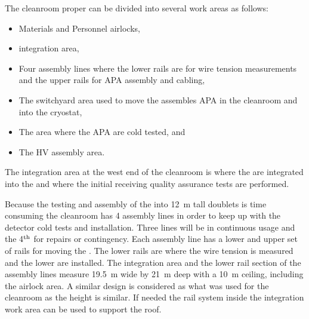 The cleanroom proper can be divided into several work areas as follows:
\begin{itemize}
\setlength\itemsep{1mm}
\setlength{\parsep}{1mm}
\setlength{\itemsep}{-5mm}
    \item Materials and Personnel airlocks,
    \item {} integration area,
    \item Four  assembly lines where the lower rails are for wire tension measurements and the upper rails for APA  assembly and cabling,
    \item The switchyard area used to move the assembles APA in the cleanroom and into the cryostat,
    \item The \coldbox area where the APA are cold tested, and
    \item The HV assembly area.
\end{itemize}

The  integration area at the west end of the cleanroom is where the  are integrated into the  and where the initial receiving quality assurance tests are performed. 

Because the testing and assembly of the  into \SI{12}{m} tall doublets is time consuming the cleanroom has 4 assembly lines in order to keep up with the detector cold tests and installation. 
Three lines will be in continuous usage and the 4$^{\rm th}$ for repairs or contingency. 
Each assembly line has a lower and upper set of rails for moving the .
The lower rails are where the wire tension is measured and the lower   are installed. The  integration area and the lower rail section of the assembly lines measure \SI{19.5}{m} wide by \SI{21}{m} deep with a \SI{10}{m} ceiling, including the airlock area. 
A similar design is considered as what was used for the  cleanroom as the height is similar. 
If needed the rail system inside the integration work area can be used to support the roof.
 
